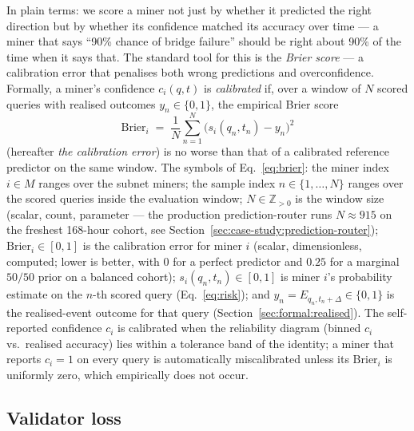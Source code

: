 \documentclass[11pt,a4paper]{article}
\begin{document}
In plain terms: we score a miner not just by whether it predicted the right
direction but by whether its confidence matched its accuracy over time --- a miner
that says ``90\% chance of bridge failure'' should be right about 90\% of the time
when it says that. The standard tool for this is the \emph{Brier score} --- a
calibration error that penalises both wrong predictions and overconfidence. Formally,
a miner's confidence $c_i(q, t)$ is \emph{calibrated} if, over a window of $N$ scored
queries with realised outcomes $y_n \in \{0,1\}$, the empirical Brier score
\begin{equation}
  \text{Brier}_i \;=\; \frac{1}{N} \sum_{n=1}^{N} \bigl( s_i(q_n, t_n) - y_n \bigr)^{2}
  \label{eq:brier}
\end{equation}
(hereafter \emph{the calibration error}) is no worse than that of a calibrated
reference predictor on the same window. The symbols of Eq.~\eqref{eq:brier}: the
miner index $i \in M$ ranges over the subnet miners; the sample index
$n \in \{1, \dots, N\}$ ranges over the scored queries inside the evaluation
window; $N \in \mathbb{Z}_{>0}$ is the window size (scalar, count, parameter ---
the production prediction-router runs $N \approx 915$ on the freshest 168-hour
cohort, see Section~\ref{sec:case-study:prediction-router});
$\text{Brier}_i \in [0, 1]$ is the calibration error for miner $i$ (scalar,
dimensionless, computed; lower is better, with $0$ for a perfect predictor and
$0.25$ for a marginal $50/50$ prior on a balanced cohort); $s_i(q_n, t_n) \in
[0, 1]$ is miner $i$'s probability estimate on the $n$-th scored query
(Eq.~\eqref{eq:risk}); and $y_n = E_{q_n, t_n + \Delta} \in \{0, 1\}$ is the
realised-event outcome for that query (Section~\ref{sec:formal:realised}).
The self-reported confidence $c_i$ is calibrated when the reliability diagram
(binned $c_i$ vs.\ realised accuracy) lies within a tolerance band of the
identity; a miner that reports $c_i = 1$ on every query is automatically
miscalibrated unless its $\text{Brier}_i$ is uniformly zero, which empirically
does not occur.

\subsection{Validator loss}\label{sec:formal:vloss}
\end{document}

